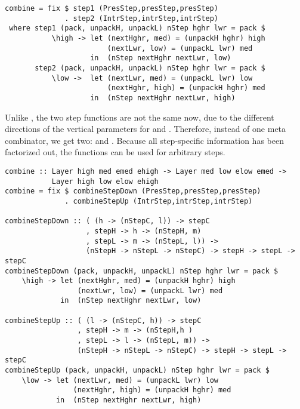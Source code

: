 \documentclass[preprint,natbib]{sigplanconf}
\begin{document}
\begin{small}
\begin{verbatim}
combine = fix $ step1 (PresStep,presStep,presStep) 
              . step2 (IntrStep,intrStep,intrStep) 
 where step1 (pack, unpackH, unpackL) nStep hghr lwr = pack $
           \high -> let (nextHghr, med) = (unpackH hghr) high
                        (nextLwr, low) = (unpackL lwr) med
                    in  (nStep nextHghr nextLwr, low)
       step2 (pack, unpackH, unpackL) nStep hghr lwr = pack $
           \low ->  let (nextLwr, med) = (unpackL lwr) low
                        (nextHghr, high) = (unpackH hghr) med
                    in  (nStep nextHghr nextLwr, high)
\end{verbatim}
\end{small}

Unlike , the two step functions are not the same now, due to the different directions of the vertical parameters for  and . Therefore, instead of one meta combinator, we get two:  and . Because all step-specific information has been factorized out, the functions can be used for arbitrary steps.

\begin{small}
\begin{verbatim}
combine :: Layer high med emed ehigh -> Layer med low elow emed -> 
           Layer high low elow ehigh
combine = fix $ combineStepDown (PresStep,presStep,presStep) 
              . combineStepUp (IntrStep,intrStep,intrStep) 

combineStepDown :: ( (h -> (nStepC, l)) -> stepC 
                   , stepH -> h -> (nStepH, m)
                   , stepL -> m -> (nStepL, l)) -> 
                   (nStepH -> nStepL -> nStepC) -> stepH -> stepL -> stepC
combineStepDown (pack, unpackH, unpackL) nStep hghr lwr = pack $
    \high -> let (nextHghr, med) = (unpackH hghr) high
                 (nextLwr, low) = (unpackL lwr) med
             in  (nStep nextHghr nextLwr, low)

combineStepUp :: ( (l -> (nStepC, h)) -> stepC 
                 , stepH -> m -> (nStepH,h )
                 , stepL -> l -> (nStepL, m)) -> 
                 (nStepH -> nStepL -> nStepC) -> stepH -> stepL -> stepC
combineStepUp (pack, unpackH, unpackL) nStep hghr lwr = pack $
    \low -> let (nextLwr, med) = (unpackL lwr) low
                (nextHghr, high) = (unpackH hghr) med
            in  (nStep nextHghr nextLwr, high)
\end{verbatim}
\end{small}
\end{document}
